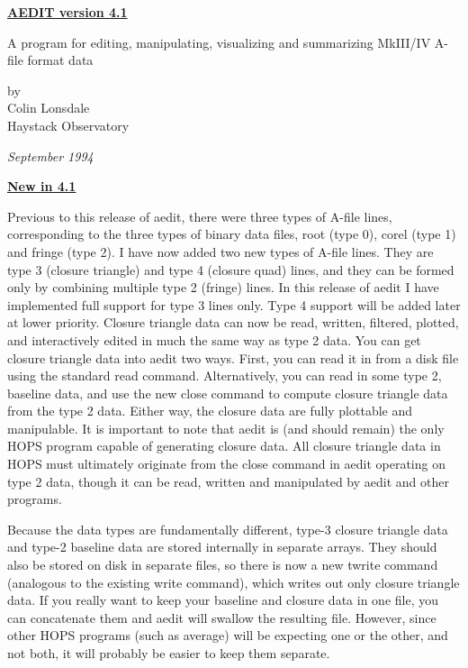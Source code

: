 
\begin{center}
\LARGE\bf
\underline{AEDIT version 4.1}

\Large\rm
A program for editing, manipulating, visualizing and summarizing
MkIII/IV A-file format data
\vspace{.4in}

by \\
Colin Lonsdale \\
Haystack Observatory \\
\vspace{.3in}

\em September 1994

\begin{center}
\large\bf
\underline{New in 4.1}
\end{center}

Previous to this release of aedit, there were three types of A-file lines, 
corresponding to the three types of binary data files, root (type 0), 
corel (type 1) and fringe (type 2).  I have now added two new types of A-file 
lines.  They are type 3 (closure triangle) and type 4 (closure quad) lines, 
and they can be formed only by combining multiple type 2 (fringe) lines.  In 
this release of aedit I have implemented full support for type 3 lines only.  
Type 4 support will be added later at lower priority.  Closure triangle data 
can now be read, written, filtered, plotted, and interactively edited in much 
the same way as type 2 data.  You can get closure triangle data into aedit 
two ways.  First, you can read it in from a disk file using the standard read 
command.  Alternatively, you can read in some type 2, baseline data, and use 
the new close command to compute closure triangle data from the type 2 data.  
Either way, the closure data are fully plottable and manipulable.  It is 
important to note that aedit is (and should remain) the only HOPS program 
capable of generating closure data.  All closure triangle data in HOPS must 
ultimately originate from the close command in aedit operating on type 2 data, 
though it can be read, written and manipulated by aedit and other programs.


Because the data types are fundamentally different, type-3 closure triangle 
data and type-2 baseline data are stored internally in separate arrays.  They 
should also be stored on disk in separate files, so there is now a new twrite 
command (analogous to the existing write command), which writes out only closure 
triangle data.  If you really want to keep your baseline and closure data in one 
file, you can concatenate them and aedit will swallow the resulting file.  However, 
since other HOPS programs (such as average) will be expecting one or the other, 
and not both, it will probably be easier to keep them separate.


\end{center}

